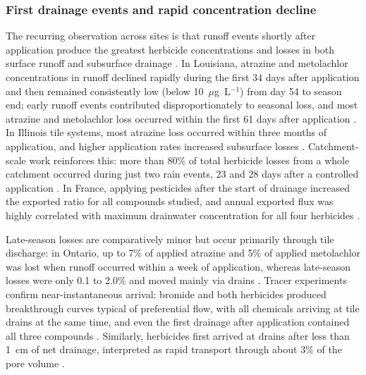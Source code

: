 \subsubsection{First drainage events and rapid concentration decline}
The recurring observation across sites is that runoff events shortly after application produce the greatest herbicide concentrations and losses in both surface runoff and subsurface drainage \parencite{GAYNOR1995}. In Louisiana, atrazine and metolachlor concentrations in runoff declined rapidly during the first 34 days after application and then remained consistently low (below 10~$\mu$g~L$^{-1}$) from day 54 to season end; early runoff events contributed disproportionately to seasonal loss, and most atrazine and metolachlor loss occurred within the first 61 days after application \parencite{SOUTHWICK1990}. In Illinois tile systems, most atrazine loss occurred within three months of application, and higher application rates increased subsurface losses \parencite{Kalita2006}. Catchment-scale work reinforces this: more than 80\% of total herbicide losses from a whole catchment occurred during just two rain events, 23 and 28 days after a controlled application \parencite{Leu2004}. In France, applying pesticides after the start of drainage increased the exported ratio for all compounds studied, and annual exported flux was highly correlated with maximum drainwater concentration for all four herbicides \parencite{Julien2023}.

Late-season losses are comparatively minor but occur primarily through tile discharge: in Ontario, up to 7\% of applied atrazine and 5\% of applied metolachlor was lost when runoff occurred within a week of application, whereas late-season losses were only 0.1 to 2.0\% and moved mainly via drains \parencite{GAYNOR1995}. Tracer experiments confirm near-instantaneous arrival: bromide and both herbicides produced breakthrough curves typical of preferential flow, with all chemicals arriving at tile drains at the same time, and even the first drainage after application contained all three compounds \parencite{Fortin2002}. Similarly, herbicides first arrived at drains after less than 1~cm of net drainage, interpreted as rapid transport through about 3\% of the pore volume \parencite{Dousset2004}.

